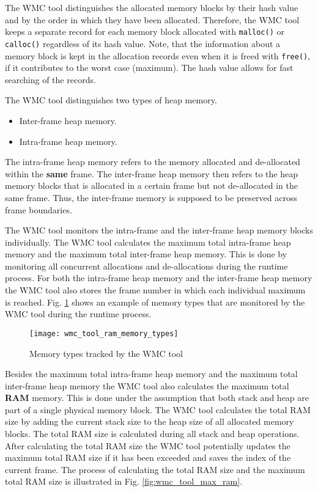 The WMC tool distinguishes the allocated memory blocks by their hash value and by the order in which they have been allocated. Therefore, the WMC tool keeps a separate record for each memory block allocated with \verb|malloc()| or \verb|calloc()| regardless of its hash value. Note, that the information about a memory block is kept in the allocation records even when it is freed with \verb|free()|, if it contributes to the worst case (maximum). The hash value allows for fast searching of the records.

The WMC tool distinguishes two types of heap memory.

\begin{itemize}
  \item Inter-frame heap memory.
  \item Intra-frame heap memory.
\end{itemize}

The intra-frame heap memory refers to the memory allocated and de-allocated within the \textbf{same} frame. The inter-frame heap memory then refers to the heap memory blocks that is allocated in a certain frame but not de-allocated in the same frame. Thus, the inter-frame memory is supposed to be preserved across frame boundaries.

The WMC tool monitors the intra-frame and the inter-frame heap memory blocks individually. The WMC tool calculates the maximum total intra-frame heap memory and the maximum total inter-frame heap memory. This is done by monitoring all concurrent allocations and de-allocations during the runtime process. For both the intra-frame heap memory and the inter-frame heap memory the WMC tool also stores the frame number in which each individual maximum is reached. Fig. \ref{fig:wmc_tool_ram_memory_types} shows an example of memory types that are monitored by the WMC tool during the runtime process.

\begin{figure}[hbtp]
\begin{center}
\texttt{[image: wmc\_tool\_ram\_memory\_types]}
\end{center}
\caption{Memory types tracked by the WMC tool}
\label{fig:wmc_tool_ram_memory_types}
\end{figure}

Besides the maximum total intra-frame heap memory and the maximum total inter-frame heap memory the WMC tool also calculates the maximum total \textbf{RAM} memory. This is done under the assumption that both stack and heap are part of a single physical memory block. The WMC tool calculates the total RAM size by adding the current stack size to the heap size of all allocated memory blocks. The total RAM size is calculated during all stack and heap operations. After calculating the total RAM size the WMC tool potentially updates the maximum total RAM size if it has been exceeded and saves the index of the current frame. The process of calculating the total RAM size and the maximum total RAM size is illustrated in Fig. \ref{fig:wmc_tool_max_ram}.

